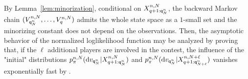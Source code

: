 By Lemma~\ref{lem:minorization}, conditional on $X_{q+1:{\mathsf{q}}^{n}_{N}}^{n,N}$, the backward Markov chain $(V_{{\mathsf{q}}^{n}_{N}}^{n,N},\ldots,V_{q}^{n,N})$ admits the whole state space as a $1$-small set and the minorizing constant does not depend on the observations. Then, the asymptotic behavior of the normalized loglikelihood function may be analyzed by proving that, if the $\ell$ additional players are involved in the contest, the influence of the "initial" distributions $p_{\pi}^{n,N}(\mathrm{d} v_{{\mathsf{q}}^{n}_{N}}|X^{n,N}_{q+1:{\mathsf{q}}^{n}_{N}})$ and $p_{\pi}^{n,N}(\mathrm{d} v_{{\mathsf{q}}^{n}_{N}}|X^{n,N+\ell}_{q+1:{\mathsf{q}}^{n}_{N+\ell}})$ vanishes exponentially fast by \cite{lindvall:1992}.


